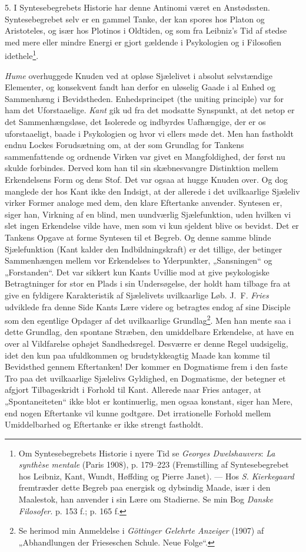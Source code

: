 \documentclass[12pt,a4paper]{book}
\newcommand{\apage}[1]{\marginnote{\footnotesize\textit{[#1]}}}
\begin{document}
5. I Syntesebegrebets Historie har denne Antinomi været en
Anstødssten. Syntesebegrebet selv er en gammel Tanke, der kan spores
hos Platon og Aristoteles, og især hos Plotinos i Oldtiden, og som fra
Leibniz’s Tid af stedse med mere eller mindre Energi er gjort gældende
i Psykologien og i Filosofien idethele\footnote{Om Syntesebegrebets
Historie i nyere Tid se \emph{Georges Dwelshauvers}: \emph{La synthèse
mentale} (Paris 1908), p. 179--223 (Fremstilling af Syntesebegrebet
hos Leibniz, Kant, Wundt, Høffding og Pierre Janet). --- Hos \emph{S.
Kierkegaard} fremtræder dette Begreb paa energisk og dybsindig Maade,
især i den Maalestok, han anvender i sin Lære om Stadierne. Se min Bog
\emph{Danske Filosofer}. p. 153 f.; p. 165 f.}.

\emph{Hume} overhuggede Knuden ved at opløse Sjælelivet i absolut
selvstændige Elementer, og konsekvent fandt han derfor en uløselig
Gaade i al Enhed og Sammenhæng i Bevidstheden. Enhedsprincipet (the
uniting principle) var for ham det Uforstaaelige. \emph{Kant} gik ud
fra det modsatte Synspunkt, at det netop er det Sammenhængsløse, det
Isolerede og indbyrdes Uafhængige, der er os uforstaaeligt, baade i
Psykologien og hvor vi ellers møde det. Men han fastholdt endnu Lockes
Forudsætning om, at der som Grundlag for \apage{16} Tankens sammenfattende og
ordnende Virken var givet en Mangfoldighed, der først nu skulde
forbindes. Derved kom han til sin skæbnesvangre Distinktion mellem
Erkendelsens Form og dens Stof. Det var ogsaa at hugge Knuden over. Og
dog manglede der hos Kant ikke den Indsigt, at der allerede i det
uvilkaarlige Sjæleliv virker Former analoge med dem, den klare
Eftertanke anvender. Syntesen er, siger han, Virkning af en blind, men
uundværlig Sjælefunktion, uden hvilken vi slet ingen Erkendelse vilde
have, men som vi kun sjeldent blive os bevidst. Det er Tankens Opgave
at forme Syntesen til et Begreb. Og denne samme blinde Sjælefunktion
(Kant kalder den Indbildningskraft) er det tillige, der betinger
Sammenhængen mellem vor Erkendelses to Yderpunkter, „Sansningen“ og
„Forstanden“. Det var sikkert kun Kants Uvillie mod at give
psykologiske Betragtninger for stor en Plads i sin Undersøgelse, der
holdt ham tilbage fra at give en fyldigere Karakteristik af Sjælelivets
uvilkaarlige Løb. J.\ F. \emph{Fries} udviklede fra denne Side Kants
Lære videre og betragtes endog af sine Disciple som den egentlige
Opdager af det uvilkaarlige Grundlag\footnote{Se herimod min
Anmeldelse i \emph{Göttinger Gelehrte Anzeiger} (1907) af
„Abhandlungen der Frieseschen Schule. Neue Folge“.}. Men han mente saa
i dette Grundlag, den spontane Stræben, den umiddelbare Erkendelse, at
have en over al Vildfarelse ophøjet Sandhedsregel. Desværre er denne
Regel uudsigelig, idet den kun paa ufuldkommen og brudstykkeagtig
Maade kan komme til Bevidsthed gennem Eftertanken! Der kommer en
Dogmatisme frem i den faste Tro paa det uvilkaarlige Sjælelivs
Gyldighed, en Dogmatisme, der betegner et afgjort Tilbageskridt i
Forhold til Kant. Allerede naar Fries antager, at „Spontaneiteten“
ikke blot er kontinuerlig, men ogsaa konstant, siger han Mere, end
nogen Eftertanke vil kunne godtgøre. Det irrationelle Forhold mellem
Umiddelbarhed og Eftertanke er ikke strengt fastholdt.
\end{document}
